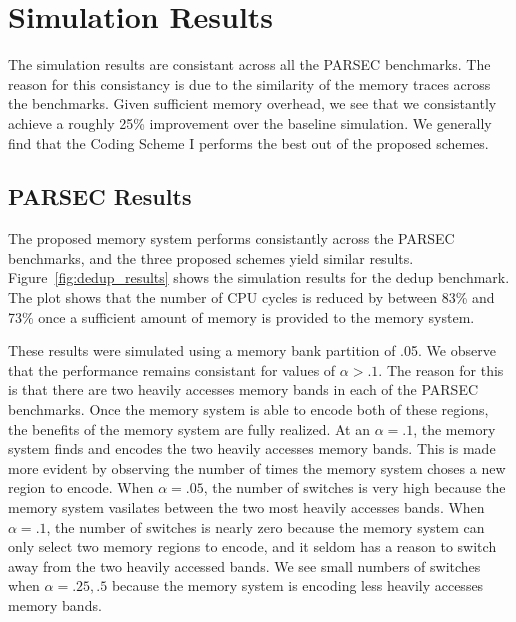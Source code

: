 \section{Simulation Results}
\label{sec:simulation}
The simulation results are consistant across all the PARSEC benchmarks. The reason for this consistancy is due to the similarity of the memory traces across the benchmarks. Given sufficient memory overhead, we see that we consistantly achieve a roughly 25\% improvement over the baseline simulation. We generally find that the Coding Scheme I performs the best out of the proposed schemes. 

\subsection{PARSEC Results}

The proposed memory system performs consistantly across the PARSEC benchmarks, and the three proposed schemes yield similar results. Figure~\ref{fig:dedup_results} shows the simulation results for the dedup benchmark. The plot shows that the number of CPU cycles is reduced by between 83\% and 73\% once a sufficient amount of memory is provided to the memory system. 

These results were simulated using a memory bank partition of .05. We observe that the performance remains consistant for values of $\alpha > .1$. The reason for this is that there are two heavily accesses memory bands in each of the PARSEC benchmarks. Once the memory system is able to encode both of these regions, the benefits of the memory system are fully realized. At an $\alpha = .1$, the memory system finds and encodes the two heavily accesses memory bands. This is made more evident by observing the number of times the memory system choses a new region to encode. When $\alpha = .05$, the number of switches is very high because the memory system vasilates between the two most heavily accesses bands. When $\alpha = .1$, the number of switches is nearly zero because the memory system can only select two memory regions to encode, and it seldom has a reason to switch away from the two heavily accessed bands. We see small numbers of switches when $\alpha = {.25, .5}$ because the memory system is encoding less heavily accesses memory bands.

